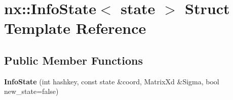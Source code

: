 \hypertarget{structnx_1_1InfoState}{}\section{nx\+:\+:Info\+State$<$ state $>$ Struct Template Reference}
\label{structnx_1_1InfoState}
\subsection*{Public Member Functions}
\begin{DoxyCompactItemize}
\item 
\mbox{\label{structnx_1_1InfoState_a582709ca7040dff17e5e2a9450bf171e}} 
{\bfseries Info\+State} (int hashkey, const state \&coord, Matrix\+Xd \&Sigma, bool new\+\_\+state=false)
\end{DoxyCompactItemize}
